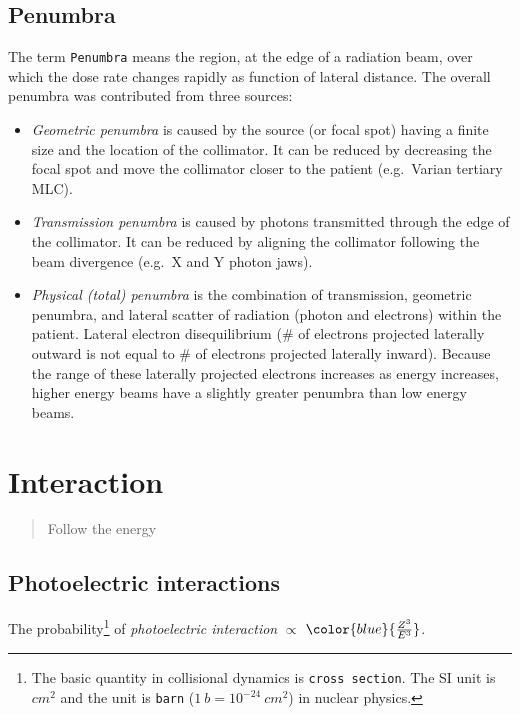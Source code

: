 \documentclass[]{book}
\providecommand{\tightlist}{%
  \setlength{\itemsep}{0pt}\setlength{\parskip}{0pt}}
\let\rmarkdownfootnote\footnote%
\def\footnote{\protect\rmarkdownfootnote}
\theoremstyle{definition}
\theoremstyle{definition}
\theoremstyle{definition}
\theoremstyle{remark}
\begin{document}
\section{Penumbra}\label{penumbra}

The term \texttt{Penumbra} means the region, at the edge of a radiation
beam, over which the dose rate changes rapidly as function of lateral
distance. The overall penumbra was contributed from three sources:

\begin{itemize}
\tightlist
\item
  \emph{Geometric penumbra} is caused by the source (or focal spot)
  having a finite size and the location of the collimator. It can be
  reduced by decreasing the focal spot and move the collimator closer to
  the patient (e.g.~Varian tertiary MLC).
\item
  \emph{Transmission penumbra} is caused by photons transmitted through
  the edge of the collimator. It can be reduced by aligning the
  collimator following the beam divergence (e.g.~X and Y photon jaws).
\item
  \emph{Physical (total) penumbra} is the combination of transmission,
  geometric penumbra, and lateral scatter of radiation (photon and
  electrons) within the patient. Lateral electron disequilibrium (\# of
  electrons projected laterally outward is not equal to \# of electrons
  projected laterally inward). Because the range of these laterally
  projected electrons increases as energy increases, higher energy beams
  have a slightly greater penumbra than low energy beams.
\end{itemize}

\chapter{Interaction}\label{inter}

\begin{quote}
Follow the energy
\end{quote}

\section{Photoelectric interactions}\label{photo-el}

The probability\footnote{The basic quantity in collisional dynamics is
  \texttt{cross\ section}. The SI unit is \(cm^2\) and the unit is
  \texttt{barn} (\(1\ b = 10^{-24}\ cm^2\)) in nuclear physics.} of
\emph{photoelectric interaction} \(\propto\)
\(\color{blue} {\frac{Z^3}{E^3}}\).
\end{document}
